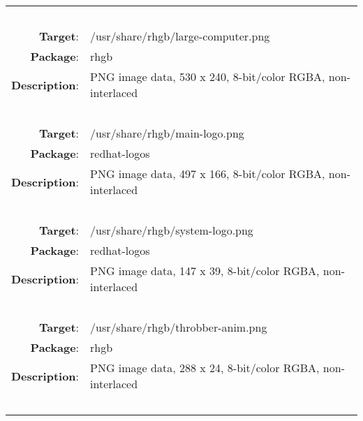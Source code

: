 \begin{longtable}{rl}
\hline
\multicolumn{2}{l}{\ }\\
\textbf{Target}: & /usr/share/rhgb/large-computer.png\\
\textbf{Package}: & rhgb\\
\textbf{Description}: & PNG image data, 530 x 240, 8-bit/color RGBA, non-interlaced\\
\multicolumn{2}{l}{\ }\\
\textbf{Target}: & /usr/share/rhgb/main-logo.png\\
\textbf{Package}: & redhat-logos\\
\textbf{Description}: & PNG image data, 497 x 166, 8-bit/color RGBA, non-interlaced\\
\multicolumn{2}{l}{\ }\\
\textbf{Target}: & /usr/share/rhgb/system-logo.png\\
\textbf{Package}: & redhat-logos\\
\textbf{Description}: & PNG image data, 147 x 39, 8-bit/color RGBA, non-interlaced\\
\multicolumn{2}{l}{\ }\\
\textbf{Target}: & /usr/share/rhgb/throbber-anim.png\\
\textbf{Package}: & rhgb\\
\textbf{Description}: & PNG image data, 288 x 24, 8-bit/color RGBA, non-interlaced\\
\multicolumn{2}{l}{\ }\\
\hline
\end{longtable}
